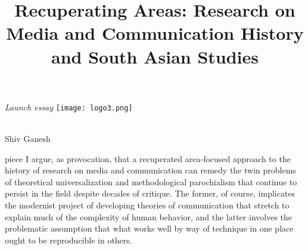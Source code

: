 \documentclass{tufte-handout}
\title[Recuperating Areas]{Recuperating Areas: Research on Media and Communication History and South Asian Studies} %
\begin{document}
\begin{titlepage}

\begin{fullwidth}
\noindent\LARGE\emph{Launch essay
} \hspace{85mm}\texttt{[image: logo3.png]}\\
\noindent\hrulefill\\
\vspace*{1em}

\vspace*{1.5em}

\noindent\LARGE{Shiv Ganesh\par}
\vspace*{0.5em}
 





\end{fullwidth}

\vspace*{1em}


 piece I argue, as provocation, that a recuperated
area-focused approach to the history of research on media and
communication can remedy the twin problems of theoretical
universalization and methodological parochialism that continue to
persist in the field despite decades of critique. The former, of course,
implicates the modernist project of developing theories of communication
that stretch to explain much of the complexity of human behavior, and
the latter involves the problematic assumption that what works well by
way of technique in one place ought to be reproducible in others.


\end{titlepage}
\end{document}
